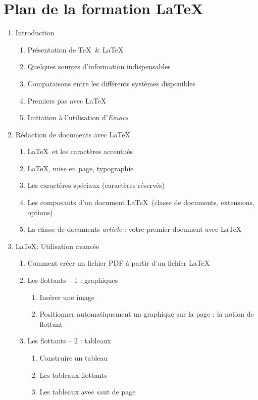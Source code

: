 \section{Plan de la formation \LaTeX}

\begin{enumerate}
  
\item Introduction
  \begin{enumerate}
  \item Présentation de \TeX\ \& \LaTeX
  \item Quelques sources d'information indispensables
  \item Comparaisons entre les différents systèmes disponibles
  \item Premiers pas avec \LaTeX
  \item Initiation à l'utilisation d'\emph{Emacs}
  \end{enumerate}
  
\item Rédaction de documents avec \LaTeX\
  \begin{enumerate}
  \item \LaTeX\ et les caractères accentués
  \item \LaTeX, mise en page, typographie
  \item Les caractères spéciaux (caractères réservés)
  \item Les composants d'un document \LaTeX\ (classe de documents, extensions,
    options)
  \item La classe de documents \emph{article} : votre premier document avec
    \LaTeX
  \end{enumerate}

  
\item \LaTeX : Utilisation avancée
  \begin{enumerate}
  \item Comment créer un fichier PDF à partir d'un fichier \LaTeX
  \item Les flottants -- 1 : graphiques
    \begin{enumerate}
    \item Insérer une image
    \item Positionner automatiquement un graphique sur la page : la notion de
      \og flottant \fg
    \end{enumerate}
  \item Les flottants -- 2 : tableaux
    \begin{enumerate}
    \item Construire un tableau
    \item Les tableaux flottants
    \item Les tableaux avec saut de page
    \end{enumerate}
  \end{enumerate}



\end{enumerate}
